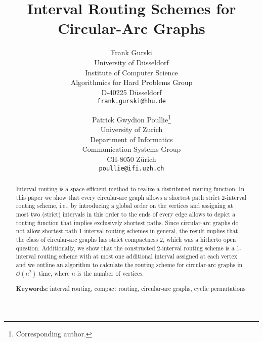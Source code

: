 \documentclass[10pt]{article}
\begin{document}
\title{Interval Routing Schemes for Circular-Arc Graphs}

\author{
Frank Gurski \\
University of D\"usseldorf\\
Institute of Computer Science\\
Algorithmics for Hard Problems Group\\
D-40225 D\"usseldorf\\
\texttt{frank.gurski@hhu.de}
\and 
Patrick Gwydion Poullie\thanks{Corresponding author.} \\
University of Zurich \\
Department of Informatics \\ Communication Systems Group\\
CH-8050 Z\"urich\\
\texttt{poullie@ifi.uzh.ch}
}


\maketitle





\begin{abstract}
Interval routing is a space efficient method to realize a distributed 
routing function.
In this paper we show that every circular-arc graph allows a shortest 
path strict 2-interval routing scheme, i.e., by introducing a global order
on the vertices and assigning at most two (strict) intervals in this order
to the ends of every edge allows to depict a routing function that 
implies exclusively shortest paths. Since circular-arc graphs do not allow shortest path 1-interval routing 
schemes in general, the result implies that the class of circular-arc 
graphs has strict compactness 2, which was a hitherto open question.
Additionally, we show that the constructed 2-interval routing scheme is 
a 1-interval routing scheme with at most one additional 
interval assigned at each vertex and we outline an algorithm 
to calculate the routing scheme for circular-arc graphs in 
$\mathcal{O}(n^2)$ time, where $n$ is the number of vertices.

\bigskip
\noindent
{\bf Keywords:} interval routing, compact routing, circular-arc graphs, cyclic permutations
\end{abstract}
\end{document}
